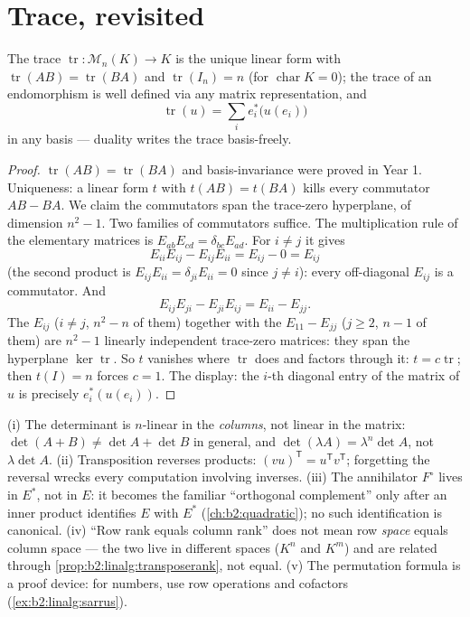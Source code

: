 \section{Trace, revisited}

\begin{proposition}\label{prop:b2:linalg:trace}
The trace $\operatorname{tr} \colon \mathcal{M}_n(K) \to K$ is the
unique linear form with $\operatorname{tr}(AB) =
\operatorname{tr}(BA)$ and $\operatorname{tr}(I_n) = n$ (for
$\operatorname{char} K = 0$); the trace of an endomorphism is
well defined via any matrix representation, and
\[
\operatorname{tr}(u) = \sum_{i} e_i^*\bigl(u(e_i)\bigr)
\]
in any basis --- duality writes the trace basis-freely.
\end{proposition}

\begin{proof}
$\operatorname{tr}(AB) = \operatorname{tr}(BA)$ and basis-invariance
were proved in Year 1. Uniqueness: a linear form $t$ with $t(AB) =
t(BA)$ kills every commutator $AB - BA$. We claim the commutators
span the trace-zero hyperplane, of dimension $n^2 - 1$. Two
families of commutators suffice. The multiplication rule of the
elementary matrices is $E_{ab}E_{cd} = \delta_{bc}E_{ad}$. For
$i \neq j$ it gives
\[
E_{ii}E_{ij} - E_{ij}E_{ii} = E_{ij} - 0 = E_{ij}
\]
(the second product is $E_{ij}E_{ii} = \delta_{ji}E_{ii} = 0$
since $j \neq i$): every off-diagonal $E_{ij}$ is a commutator.
And
\[
E_{ij}E_{ji} - E_{ji}E_{ij} = E_{ii} - E_{jj} .
\]
The $E_{ij}$ ($i \neq j$, $n^2 - n$ of them) together with the
$E_{11} - E_{jj}$ ($j \geq 2$, $n - 1$ of them) are $n^2 - 1$
linearly independent trace-zero matrices: they span the
hyperplane $\ker\operatorname{tr}$. So $t$ vanishes where
$\operatorname{tr}$ does and factors through it: $t =
c\operatorname{tr}$; then $t(I) = n$ forces $c = 1$. The display:
the $i$-th diagonal entry of the matrix of $u$ is precisely
$e_i^*(u(e_i))$.
\end{proof}

\begin{remark}\label{rem:b2:linalg:pitfalls}
(i) The determinant is $n$-linear in the \emph{columns}, not
linear in the matrix: $\det(A + B) \neq \det A + \det B$ in
general, and $\det(\lambda A) = \lambda^n\det A$, not
$\lambda\det A$. (ii) Transposition reverses products:
$(vu)^{\mathsf T} = u^{\mathsf T}v^{\mathsf T}$; forgetting the
reversal wrecks every computation involving inverses. (iii) The
annihilator $F^\circ$ lives in $E^*$, not in $E$: it becomes the
familiar ``orthogonal complement'' only after an inner product
identifies $E$ with $E^*$ (\cref{ch:b2:quadratic}); no such
identification is canonical. (iv) ``Row rank equals column
rank'' does not mean row \emph{space} equals column space ---
the two live in different spaces ($K^n$ and $K^m$) and are
related through \cref{prop:b2:linalg:transposerank}, not equal.
(v) The permutation formula is a proof device: for numbers, use
row operations and cofactors (\cref{ex:b2:linalg:sarrus}).
\end{remark}

